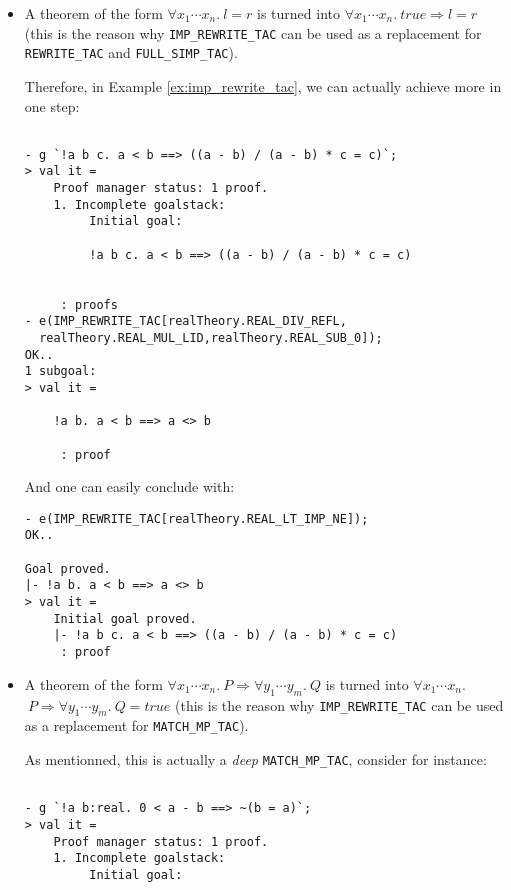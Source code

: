 \documentclass{llncs}
\newcommand*\IMPREWRITETAC{\texttt{IMP\_REWRITE\_TAC}\xspace}
\newcommand*\REWRITETAC{\texttt{REWRITE\_TAC}\xspace}
\newcommand*\SIMPTAC{\texttt{FULL\_SIMP\_TAC}\xspace}
\newcommand*\MATCHMPTAC{\texttt{MATCH\_MP\_TAC}\xspace}
\begin{document}
		\begin{itemize}
			\item A theorem of the form $\forall x_1\cdots x_n.\ l=r$
        is turned into $\forall x_1\cdots x_n.\ true \Rightarrow l=r$
        (this is the reason why \IMPREWRITETAC can be used as a replacement for
        \REWRITETAC and \SIMPTAC).

        Therefore, in Example \ref{ex:imp_rewrite_tac}, we can actually achieve more in one step:
    \begin{example}
      \label{ex:imp_rewrite_tac_rewrite}
        \begin{verbatim}

- g `!a b c. a < b ==> ((a - b) / (a - b) * c = c)`;
> val it =
    Proof manager status: 1 proof.
    1. Incomplete goalstack:
         Initial goal:
    
         !a b c. a < b ==> ((a - b) / (a - b) * c = c)
    
    
     : proofs
- e(IMP_REWRITE_TAC[realTheory.REAL_DIV_REFL,
  realTheory.REAL_MUL_LID,realTheory.REAL_SUB_0]);
OK..
1 subgoal:
> val it =
    
    !a b. a < b ==> a <> b
    
     : proof \end{verbatim}
        And one can easily conclude with:
        \begin{verbatim}
- e(IMP_REWRITE_TAC[realTheory.REAL_LT_IMP_NE]);
OK..

Goal proved.
|- !a b. a < b ==> a <> b
> val it =
    Initial goal proved.
    |- !a b c. a < b ==> ((a - b) / (a - b) * c = c)
     : proof \end{verbatim}
    \end{example}

			\item A theorem of the form $\forall x_1\cdots x_n.\ P \Rightarrow \forall y_1\cdots y_m.\ Q$
				is turned into $\forall x_1\cdots x_n.$ $\ P \Rightarrow \forall y_1\cdots y_m.\ Q=true$
        (this is the reason why \IMPREWRITETAC can be used as a replacement for \MATCHMPTAC).

        As mentionned, this is actually a \emph{deep} \MATCHMPTAC, consider for instance:
        \begin{example}
        \begin{verbatim}

- g `!a b:real. 0 < a - b ==> ~(b = a)`;
> val it =
    Proof manager status: 1 proof.
    1. Incomplete goalstack:
         Initial goal:
    

\end{verbatim}
\end{example}
\end{itemize}
\end{document}
